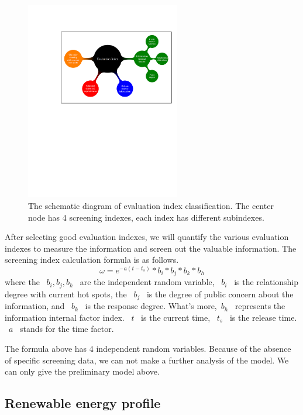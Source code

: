 \documentclass[a4paper,11pt]{article}
\begin{document}
\begin{figure}[h]%
    \centering 
    \includegraphics[width=0.6\textwidth]{./Pic/The_schematic_diagram_of_evaluation_index_classification.pdf}
    \caption{The schematic diagram of evaluation index classification. The center node has 4 screening indexes, each index has different subindexes.}
    \label{fig:The_schematic_diagram_of_evaluation_index_classification}  
\end{figure}

\par After selecting good evaluation indexes, we will quantify the various evaluation indexes to measure the information and screen out the valuable information. The screening index calculation formula is as follows.
\begin{equation}
\omega=e^{-a(t-t_s)}*b _i*b _j*b _k*b_h
\end{equation}
where the ~$b _i,b _j,b _k$~ are the independent random variable, ~$b _i$~ is the relationship degree with current hot spots, the ~$b _j$~ is the degree of public concern about the information, and ~$b _k$~ is the response degree. What's more,~$b_h$~ represents the  information internal factor index. ~$t$~ is the current time, ~$t_s$~ is the release time. ~$a$~ stands for the time factor.
\par The formula above has 4 independent random variables. Because of the absence of specific screening data, we can not make a further analysis of the model. We can only give the preliminary model above.


\subsection{Renewable energy profile}
\end{document}
